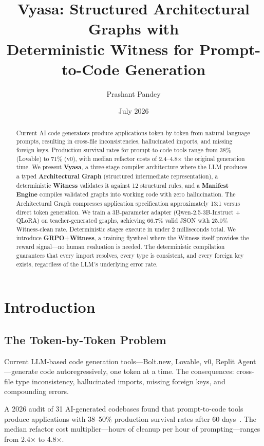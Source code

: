 \documentclass{article}
\title{Vyasa: Structured Architectural Graphs with\\Deterministic Witness for Prompt-to-Code Generation}
\author{Prashant Pandey}
\date{July 2026}
\begin{document}
\maketitle

\begin{abstract}
Current AI code generators produce applications token-by-token from natural language prompts, resulting in cross-file inconsistencies, hallucinated imports, and missing foreign keys. Production survival rates for prompt-to-code tools range from 38\% (Lovable) to 71\% (v0), with median refactor costs of 2.4--4.8$\times$ the original generation time. We present \textbf{Vyasa}, a three-stage compiler architecture where the LLM produces a typed \textbf{Architectural Graph} (structured intermediate representation), a deterministic \textbf{Witness} validates it against 12 structural rules, and a \textbf{Manifest Engine} compiles validated graphs into working code with zero hallucination. The Architectural Graph compresses application specification approximately 13:1 versus direct token generation. We train a 3B-parameter adapter (Qwen-2.5-3B-Instruct + QLoRA) on teacher-generated graphs, achieving 66.7\% valid JSON with 25.0\% Witness-clean rate. Deterministic stages execute in under 2 milliseconds total. We introduce \textbf{GRPO+Witness}, a training flywheel where the Witness itself provides the reward signal---no human evaluation is needed. The deterministic compilation guarantees that every import resolves, every type is consistent, and every foreign key exists, regardless of the LLM's underlying error rate.
\end{abstract}

\section{Introduction}
\subsection{The Token-by-Token Problem}
Current LLM-based code generation tools---Bolt.new, Lovable, v0, Replit Agent---generate code autoregressively, one token at a time. The consequences: cross-file type inconsistency, hallucinated imports, missing foreign keys, and compounding errors.

A 2026 audit of 31 AI-generated codebases found that prompt-to-code tools produce applications with 38--50\% production survival rates after 60 days~\cite{appycodes}. The median refactor cost multiplier---hours of cleanup per hour of prompting---ranges from 2.4$\times$ to 4.8$\times$.
\end{document}
